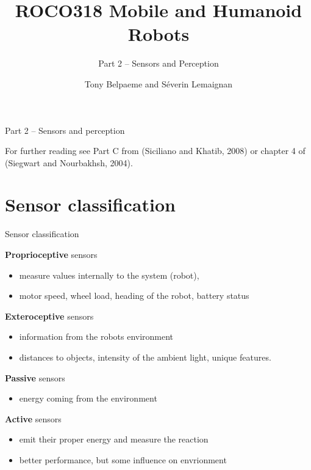 \documentclass[compress]{beamer}
\title{ROCO318 \newline Mobile and Humanoid Robots}
\subtitle{Part 2 -- Sensors and Perception}
\date{}
\author{Tony Belpaeme and Séverin Lemaignan}
\institute{Centre for Neural Systems and Robotics\\{\bf Plymouth University}}
\begin{document}

\maketitle

\begin{frame}{Part 2 -- Sensors and perception}

    For further reading see Part C from (Siciliano and Khatib, 2008) or
    chapter 4 of (Siegwart and Nourbakhsh, 2004).

\end{frame}

\section{Sensor classification}\label{sensor-classification}

\begin{frame}{Sensor classification}

    \footnotesize
    \textbf{Proprioceptive} sensors

    \begin{itemize}

        \item
              measure values internally to the system (robot),
        \item
              \eg motor speed, wheel load, heading of the robot, battery status
    \end{itemize}

    \textbf{Exteroceptive} sensors

    \begin{itemize}

        \item
              information from the robots environment
        \item
              distances to objects, intensity of the ambient light, unique features.
    \end{itemize}

    \textbf{Passive} sensors

    \begin{itemize}

        \item
              energy coming from the environment
    \end{itemize}

    \textbf{Active} sensors

    \begin{itemize}

        \item
              emit their proper energy and measure the reaction
        \item
              better performance, but some influence on envrionment
    \end{itemize}

\end{frame}
\end{document}
